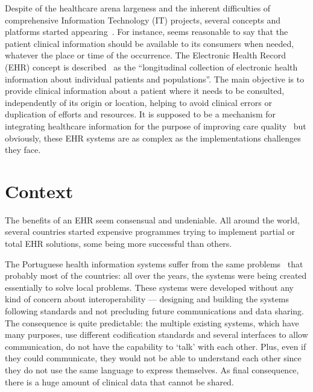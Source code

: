 Despite of the healthcare arena largeness and the inherent difficulties of comprehensive Information Technology (IT) projects, several concepts and platforms started appearing~\citep{Haux2006}. For instance, seems reasonable to say that the patient clinical information should be available to its consumers when needed, whatever the place or time of the occurrence. The Electronic Health Record (EHR) concept is described~\citep{Gunter2005} as the ``longitudinal collection of electronic health information about individual patients and populations''. The main objective is to provide clinical information about a patient where it needs to be consulted, independently of its origin or location, helping to avoid clinical errors or duplication of efforts and resources. It is supposed to be a mechanism for integrating healthcare information for the purpose of improving care quality~\citep{Orszag2008} but obviously, these EHR systems are as complex as the implementations challenges they face.

\section{Context} \label{sec:context}

The benefits of an EHR seem consensual and undeniable. All around the world, several countries started expensive programmes trying to implement partial or total EHR solutions, some being more successful than others.

The Portuguese health information systems suffer from the same problems~\citep{Deloitte2011} that probably most of the countries: all over the years, the systems were being created essentially to solve local problems. These systems were developed without any kind of concern about interoperability --- designing and building the systems following standards and not precluding future communications and data sharing. The consequence is quite predictable: the multiple existing systems, which have many purposes, use different codification standards and several interfaces to allow communication, do not have the capability to `talk' with each other. Plus, even if they could communicate, they would not be able to understand each other since they do not use the same language to express themselves. As final consequence, there is a huge amount of clinical data that cannot be shared.

